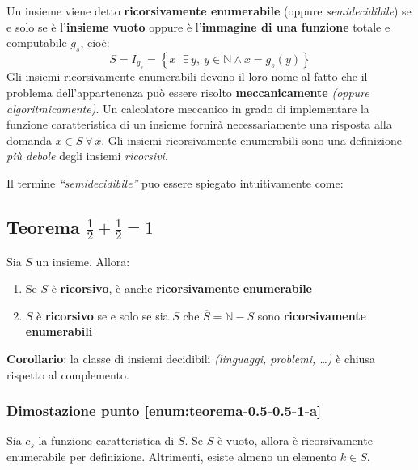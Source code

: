 \documentclass[italian, 10pt]{article}
\begin{document}
Un insieme viene detto \textbf{ricorsivamente enumerabile} (oppure \textit{semidecidibile}) se e solo se è l'\textbf{insieme vuoto} oppure è l'\textbf{immagine di una funzione} totale e computabile \(g_s\), cioè:
\[ S = I_{g_s} = \left\{ x \, | \, \exists \, y, \ y \in \mathbb{N} \land x = g_s(y)  \right\} \]
Gli insiemi ricorsivamente enumerabili devono il loro nome al fatto che il problema dell'appartenenza può essere risolto \textbf{meccanicamente} \textit{(oppure algoritmicamente)}.
Un calcolatore meccanico in grado di implementare la funzione caratteristica di un insieme fornirà necessariamente una risposta alla domanda \(x \in S \ \forall \, x\).
Gli insiemi ricorsivamente enumerabili sono una definizione \textit{più debole} degli insiemi \textit{ricorsivi}.

\bigskip
Il termine \textit{“semidecidibile”} puo essere spiegato intuitivamente come:


\subsection[Teorema 1/2 + 1/2 = 1]{Teorema \(\frac{1}{2} + \frac{1}{2} = 1\)}

Sia \(S\) un insieme.
Allora:

\begin{enumerate}[label=\Alph*), ref=(\Alph*)]
  \item \label{enum:teorema-0.5-0.5-1-a} Se \(S\) è \textbf{ricorsivo}, è anche \textbf{ricorsivamente enumerabile}
  \item \label{enum:teorema-0.5-0.5-1-b} \(S\) è \textbf{ricorsivo} se e solo se sia \(S\) che \(\overline{S} = \mathbb{N} - S\) sono \textbf{ricorsivamente enumerabili}
\end{enumerate}

\textbf{Corollario}: la classe di insiemi decidibili \textit{(linguaggi, problemi, \dots)} è chiusa rispetto al complemento.

\subsubsection{Dimostazione punto \ref{enum:teorema-0.5-0.5-1-a}}

Sia \(c_s\) la funzione caratteristica di \(S\).
Se \(S\) è vuoto, allora è ricorsivamente enumerabile per definizione.
Altrimenti, esiste almeno un elemento \(k \in S\).
\end{document}
